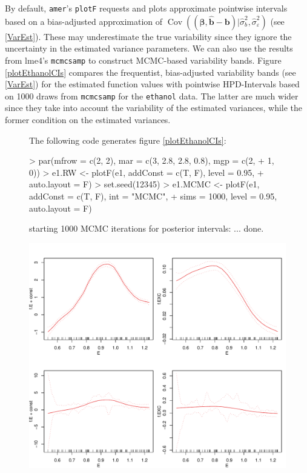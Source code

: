 \documentclass[12pt]{article}
\newenvironment{Schunk}{}{}
\newcommand{\code}[1]{\texttt{\small{#1}}}
\newcommand{\package}[1]{\textsf{\small{#1}}}
\newcommand{\eps}{\varepsilon}
\newcommand{\sigmaeps} {\sigma^2_{\eps}}
\newcommand{\Cov}{\operatorname{Cov}}
\begin{document}
By default, \code{amer}'s \code{plotF} requests and plots approximate pointwise
intervals based on a bias-adjusted approximation of $\Cov((\bm{\hat\beta,\hat b -
b})|\hat \sigma^2_b, \hat \sigmaeps)$ (see \ref{VarEst}). These may underestimate
the true variability since they ignore the uncertainty in the estimated variance
parameters. We can also use the results from \package{lme4}'s \code{mcmcsamp}
to construct MCMC-based variability bands. Figure \ref{plotEthanolCIs} compares
the frequentist, bias-adjusted variability bands (see \ref{VarEst}) for the
estimated function values with pointwise HPD-Intervals based on 1000 draws from
\code{mcmcsamp} for the \code{ethanol} data. The latter are much wider since
they take into account the variability of the estimated variances, while the
former condition on the estimated variances.
\begin{figure}[!htbp] 
The following code generates figure \ref{plotEthanolCIs}:
\begin{center}
\begin{Schunk}
\begin{Sinput}
> par(mfrow = c(2, 2), mar = c(3, 2.8, 2.8, 0.8), mgp = c(2, 
+     1, 0))
> e1.RW <- plotF(e1, addConst = c(T, F), level = 0.95, 
+     auto.layout = F)
> set.seed(12345)
> e1.MCMC <- plotF(e1, addConst = c(T, F), int = "MCMC", 
+     sims = 1000, level = 0.95, auto.layout = F)
\end{Sinput}
\begin{Soutput}
starting 1000 MCMC iterations for posterior intervals:
		... done.
\end{Soutput}
\end{Schunk}
\includegraphics{GAMMsUsingLME4-ethanolCIs}

\end{center}
\end{figure}
\end{document}
